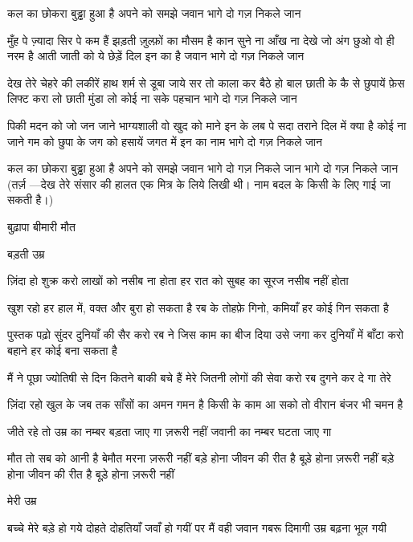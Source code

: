 कल का छोकरा बुड्ढा हुआ है
अपने को समझे जवान
भागे दो गज़ निकले जान

मुँह पे ज़्यादा सिर पे कम हैं
झड़ती ज़ुल्फ़ों का मौसम है
कान सुने ना आँख ना देखे
जो अंग छुओ वो ही नरम है
आती जाती को ये छेड़ें
दिल इन का है जवान
भागे दो गज़ निकले जान

देख तेरे चेहरे की लकीरें
हाथ शर्म से डूबा जाये
सर तो काला कर बैठे हो
बाल छाती के कै से छुपायें
फ़ेस लिफ्ट करा लो
छाती मुंडा लो
कोई ना सके पहचान
भागे दो गज़ निकले जान

पिकी मदन को जो जन जाने
भाग्यशाली वो खुद को माने
इन के लब पे सदा तराने
दिल में क्या है कोई ना जाने
गम को छुपा के जग को हसायें
जगत में इन का नाम 
भागे दो गज़ निकले जान


कल का छोकरा बुड्ढा हुआ है
अपने को समझे जवान
भागे दो गज़ निकले जान
भागे दो गज़ निकले जान
(तर्ज़ —देख तेरे संसार की हालत
एक मित्र के लिये लिखी थी। नाम बदल के
किसी के लिए गाई जा सकती है।)










बुढ़ापा बीमारी मौत









बड़ती उम्र

ज़िंदा हो शुक्र करो लाखों को नसीब ना होता 
हर रात को सुबह का सूरज नसीब नहीं होता

खुश रहो हर हाल में, वक्त और बुरा हो
सकता है
रब के तोहफ़े गिनो, कमियाँ हर कोई गिन
सकता है 

पुस्तक पढ़ो सुंदर दुनियाँ की सैर करो 
रब ने जिस काम का बीज दिया 
उसे जगा कर दुनियाँ में बाँटा करो 
बहाने हर कोई बना सकता है 

मैं ने पूछा ज्योतिषी से दिन कितने बाकी बचे
हैं मेरे
जितनी लोगों की सेवा करो रब दुगने कर दे
गा तेरे

ज़िंदा रहो खुल के जब तक साँसों का 
अमन गमन है 
किसी के काम आ सको तो वीरान बंजर भी 
चमन है 

जीते रहे तो उम्र का नम्बर बड़ता जाए गा
ज़रूरी नहीं जवानी का नम्बर घटता जाए गा

मौत तो सब को आनी है
बेमौत मरना ज़रूरी नहीं
बड़े होना जीवन की रीत है
बूड़े होना ज़रूरी नहीं
बड़े होना जीवन की रीत है
बूड़े होना ज़रूरी नहीं


मेरी उम्र

बच्चे मेरे बड़े हो गये
दोहते दोहतियाँ जवाँ हो गयीं
पर मैं वही जवान गबरू
दिमागी उम्र बढ़ना भूल गयी





